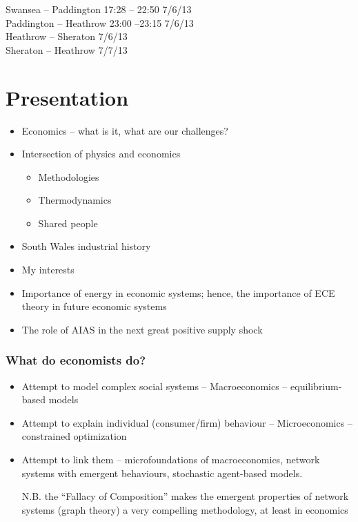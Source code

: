 \documentclass[final]{beamer}
\begin{document}
\begin{frame}
Swansea -- Paddington 17:28 -- 22:50 7/6/13\\
Paddington -- Heathrow 23:00 --23:15 7/6/13\\
Heathrow -- Sheraton 7/6/13\\
Sheraton -- Heathrow 7/7/13\\
\end{frame}

\section{Presentation}
\begin{frame}
\begin{itemize}
\frametitle{Agenda}
\item Economics -- what is it, what are our challenges?
\item Intersection of physics and economics
	\begin{itemize}
	\item Methodologies
	\item Thermodynamics
	\item Shared people
	\end{itemize}
\item South Wales industrial history
\item My interests

\item Importance of energy in economic systems; hence, the importance of ECE theory in future economic systems
\item The role of AIAS in the next great positive supply shock
\end{itemize}
\end{frame}

\begin{frame}
\frametitle{What do economists do?}
\begin{itemize}	
\item Attempt to model complex social systems -- Macroeconomics -- equilibrium-based models
\item Attempt to explain individual (consumer/firm) behaviour -- Microeconomics -- constrained optimization
\item Attempt to link them -- microfoundations of macroeconomics, network systems with emergent behaviours, stochastic agent-based models. 
\par 
N.B. the ``Fallacy of Composition'' makes the emergent properties of network systems (graph theory) a very compelling methodology, at least in economics

\end{itemize}
\end{frame}
\end{document}
